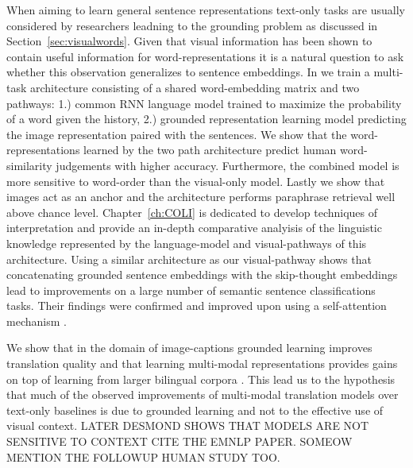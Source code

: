 When aiming to learn general sentence representations text-only tasks are usually considered by researchers
leadning to the grounding problem as discussed in Section~\ref{sec:visualwords}.
Given that visual information has been shown to contain useful information for word-representations it
is a natural question to ask whether this observation generalizes to sentence embeddings.
In \cite{chrupala2015learning} we train a multi-task architecture consisting of a shared word-embedding matrix
and two pathways: 1.) common RNN language model trained to maximize the probability of a word given the history,
2.) grounded representation learning model predicting the image representation paired with the sentences.
We show that the word-representations learned by the two path architecture predict human word-similarity
judgements with higher accuracy. Furthermore, the combined model is more sensitive to word-order than
the visual-only model.  Lastly we show that images act as an anchor and the architecture performs
paraphrase retrieval well above chance level. Chapter~\ref{ch:COLI} is dedicated to develop techniques
of interpretation and provide an in-depth comparative analyisis of the linguistic knowledge represented by
the language-model and visual-pathways of this architecture.
Using a similar architecture as our visual-pathway \cite{kiela2017learning} shows that concatenating grounded sentence
embeddings with the skip-thought embeddings lead to improvements on a large number of semantic
sentence classifications tasks. Their findings were confirmed and improved upon using a self-attention
mechanism \cite{yoo2017improving}.

 We show that in the domain of image-captions
grounded learning improves translation quality and that learning multi-modal representations
provides gains on top of learning from larger bilingual corpora \cite{elliott2017imagination}.
This lead us to the hypothesis that much of the observed improvements of multi-modal translation
models over text-only baselines is due to grounded learning and not to the effective use of visual context.
LATER DESMOND SHOWS THAT MODELS ARE NOT SENSITIVE TO CONTEXT CITE THE EMNLP PAPER. SOMEOW MENTION THE FOLLOWUP
HUMAN STUDY TOO.


